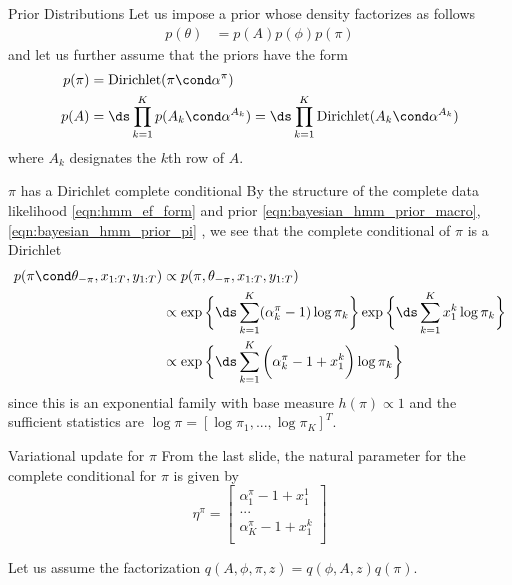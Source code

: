 \documentclass[10pt]{beamer}
\begin{document}
{\begin{frame}{Prior Distributions}
Let us impose a prior whose density factorizes as follows
\begin{align}
\label{eqn:bayesian_hmm_prior_macro}
p(\theta) &= p(A) p(\phi) p(\pi) 
 \end{align}
and let us further assume that the priors have the form
\begin{align}
p(\pi) &= \text{Dirichlet}(\pi \cond \alpha^\pi) \label{eqn:bayesian_hmm_prior_pi}  \\
p(A) &= \ds\prod_{k=1}^K p(A_k \cond \alpha^{A_k}) =  \ds\prod_{k=1}^K \text{Dirichlet}(A_k \cond \alpha^{A_k}) \label{eqn:bayesian_hmm_prior_transition} 
\end{align}
where $A_k$ designates the $k$th row of $A$. 
\end{frame}

\begin{frame}{$\pi$ has a Dirichlet complete conditional}
By the structure of the complete data likelihood \eqref{eqn:hmm_ef_form} and prior \eqref{eqn:bayesian_hmm_prior_macro}, \eqref{eqn:bayesian_hmm_prior_pi} ,  we see that the complete conditional of $\pi$ is a Dirichlet
\begin{align*}
p(\pi \cond \theta_{-\pi}, x_{1:T}, y_{1:T} ) & \propto p(\pi, \theta_{-\pi},  x_{1:T}, y_{1:T}) \\
&\propto \exp \bigg\{ \ds\sum_{k=1}^K  (\alpha_{k}^\pi -1) \log \pi_k \bigg\}  \exp \bigg\{  \ds\sum_{k=1}^K   x_{1}^k \log \pi_k  \bigg\}  \\
&\propto \exp \bigg\{ \ds\sum_{k=1}^K  \bigg( \alpha_k^\pi -1 + x_1^k \bigg) \log \pi_k   \bigg\}  
\end{align*}
since this is an exponential family with base measure $h(\pi) \propto 1$ and the sufficient statistics are $\log \pi  = [\log \pi_1, ..., \log \pi_K]^T$.      
\end{frame}

\begin{frame}{Variational update for $\pi$}
From the last slide, the natural parameter for the complete conditional for $\pi$ is given by 
\[ \eta^{\pi} =
 \begin{bmatrix} 
\alpha_1^\pi -1 + x_1^1\\
... \\
\alpha_K^\pi  -1 + x_1^k \\
 \end{bmatrix}
 \]

Let us assume the factorization $q(A,\phi,\pi, z) = q(\phi, A, z)q(\pi)$.  


\end{frame}}
\end{document}
